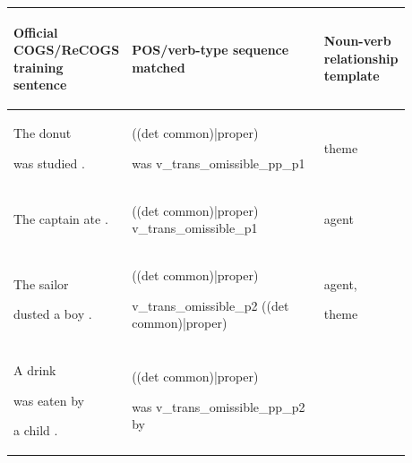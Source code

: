 \documentclass[11pt]{article}
\begin{document}
\begin{table}
\centering
\begin{tabular}{p{0.225\linewidth} p{0.50\linewidth} p{0.15\linewidth}}
\hline
\begin{tiny}\textbf{Official COGS/ReCOGS training sentence}\end{tiny} & \begin{tiny}\textbf{POS/verb-type sequence matched}\end{tiny} & \begin{tiny}\textbf{Noun-verb relationship template}\end{tiny}\\
\hline
\hline
\begin{tiny}The donut 

was studied .\end{tiny} & \begin{tiny}((det common)|proper)

was v\_trans\_omissible\_pp\_p1\end{tiny} & \begin{tiny}theme\end{tiny} \\
\hline
\begin{tiny}The captain ate .\end{tiny} & \begin{tiny}((det common)|proper) v\_trans\_omissible\_p1\end{tiny} & \begin{tiny}agent\end{tiny} \\
\hline
\begin{tiny}The sailor 

dusted a boy .\end{tiny} & \begin{tiny}((det common)|proper)

v\_trans\_omissible\_p2 ((det common)|proper)\end{tiny} & \begin{tiny} agent,

theme \end{tiny} \\
\hline
\begin{tiny}A drink 

was eaten by 

a child .\end{tiny} & \begin{tiny}((det common)|proper)

was v\_trans\_omissible\_pp\_p2 by 


\end{tiny}
\end{tabular}
\end{table}
\end{document}
